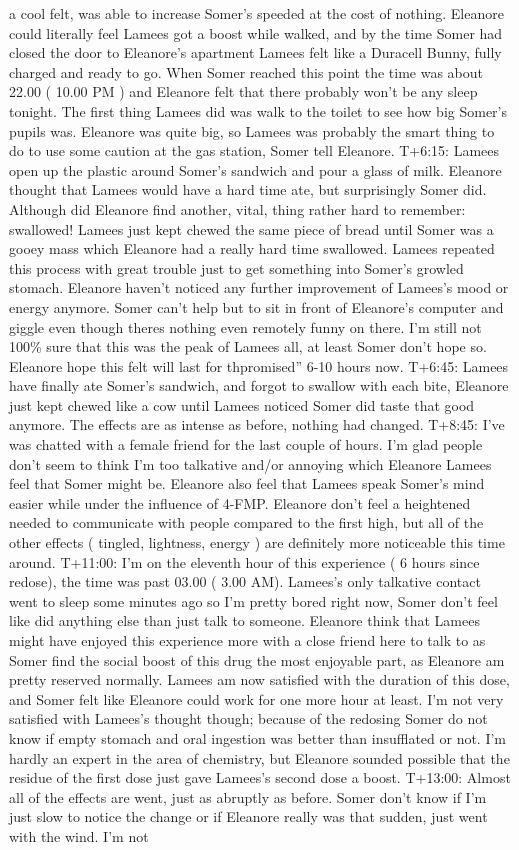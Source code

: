 \documentclass[12pt]{book}
\begin{document}
a cool felt, was able to increase Somer's speeded at the cost of nothing. Eleanore could literally feel Lamees got a boost while walked, and by the time Somer had closed the door to Eleanore's apartment Lamees felt like a Duracell Bunny, fully charged and ready to go. When Somer reached this point the time was about 22.00 ( 10.00 PM ) and Eleanore felt that there probably won't be any sleep tonight. The first thing Lamees did was walk to the toilet to see how big Somer's pupils was. Eleanore was quite big, so Lamees was probably the smart thing to do to use some caution at the gas station, Somer tell Eleanore. T+6:15: Lamees open up the plastic around Somer's sandwich and pour a glass of milk. Eleanore thought that Lamees would have a hard time ate, but surprisingly Somer did. Although did Eleanore find another, vital, thing rather hard to remember: swallowed! Lamees just kept chewed the same piece of bread until Somer was a gooey mass which Eleanore had a really hard time swallowed. Lamees repeated this process with great trouble just to get something into Somer's growled stomach. Eleanore haven't noticed any further improvement of Lamees's mood or energy anymore. Somer can't help but to sit in front of Eleanore's computer and giggle even though theres nothing even remotely funny on there. I'm still not 100\% sure that this was the peak of Lamees all, at least Somer don't hope so. Eleanore hope this felt will last for thpromised'' 6-10 hours now. T+6:45: Lamees have finally ate Somer's sandwich, and forgot to swallow with each bite, Eleanore just kept chewed like a cow until Lamees noticed Somer did taste that good anymore. The effects are as intense as before, nothing had changed. T+8:45: I've was chatted with a female friend for the last couple of hours. I'm glad people don't seem to think I'm too talkative and/or annoying which Eleanore Lamees feel that Somer might be. Eleanore also feel that Lamees speak Somer's mind easier while under the influence of 4-FMP. Eleanore don't feel a heightened needed to communicate with people compared to the first high, but all of the other effects ( tingled, lightness, energy ) are definitely more noticeable this time around. T+11:00: I'm on the eleventh hour of this experience ( 6 hours since redose), the time was past 03.00 ( 3.00 AM). Lamees's only talkative contact went to sleep some minutes ago so I'm pretty bored right now, Somer don't feel like did anything else than just talk to someone. Eleanore think that Lamees might have enjoyed this experience more with a close friend here to talk to as Somer find the social boost of this drug the most enjoyable part, as Eleanore am pretty reserved normally. Lamees am now satisfied with the duration of this dose, and Somer felt like Eleanore could work for one more hour at least. I'm not very satisfied with Lamees's thought though; because of the redosing Somer do not know if empty stomach and oral ingestion was better than insufflated or not. I'm hardly an expert in the area of chemistry, but Eleanore sounded possible that the residue of the first dose just gave Lamees's second dose a boost. T+13:00: Almost all of the effects are went, just as abruptly as before. Somer don't know if I'm just slow to notice the change or if Eleanore really was that sudden, just went with the wind. I'm not 
\end{document}
